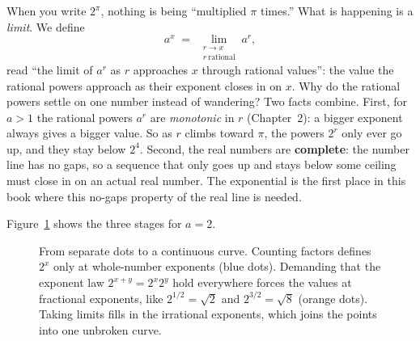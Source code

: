 \begin{happeningbox}
When you write $2^{\pi}$, nothing is being ``multiplied $\pi$ times.'' What is happening is a \emph{limit}. We define
\[
a^x \;=\; \lim_{\substack{r\to x \\ r\ \text{rational}}} a^{r},
\]
read ``the limit of $a^r$ as $r$ approaches $x$ through rational values'': the value the rational powers approach as their exponent closes in on $x$. Why do the rational powers settle on one number instead of wandering? Two facts combine. First, for $a>1$ the rational powers $a^r$ are \emph{monotonic} in $r$ (Chapter~2): a bigger exponent always gives a bigger value. So as $r$ climbs toward $\pi$, the powers $2^r$ only ever go up, and they stay below $2^4$. Second, the real numbers are \textbf{complete}: the number line has no gaps, so a sequence that only goes up and stays below some ceiling must close in on an actual real number. The exponential is the first place in this book where this no-gaps property of the real line is needed.
\end{happeningbox}

Figure~\ref{ch03:fig-discrete-to-smooth} shows the three stages for $a=2$.

\begin{figure}[htbp]
\centering
{}
\caption{From separate dots to a continuous curve. Counting factors defines $2^x$ only at whole-number exponents (blue dots). Demanding that the exponent law $2^{x+y}=2^x 2^y$ hold everywhere forces the values at fractional exponents, like $2^{1/2}=\sqrt{2}$ and $2^{3/2}=\sqrt{8}$ (orange dots). Taking limits fills in the irrational exponents, which joins the points into one unbroken curve.}
\label{ch03:fig-discrete-to-smooth}
\end{figure}

